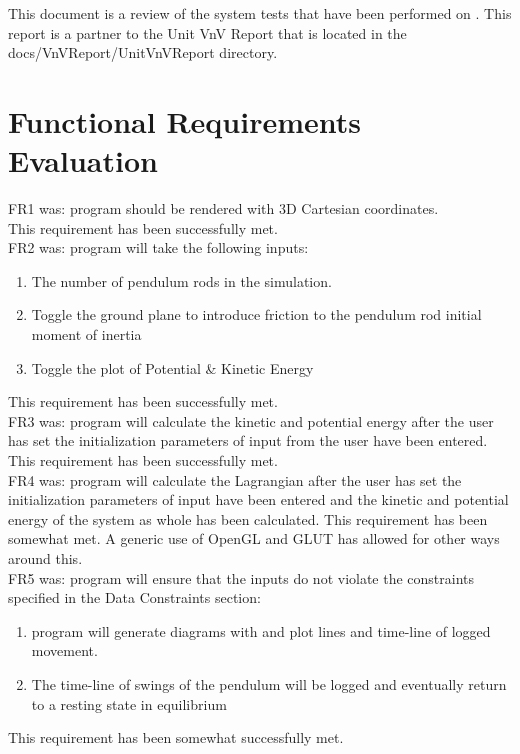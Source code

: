 \documentclass[12pt, titlepage]{article}
\begin{document}
\newpage

\tableofcontents

\listoftables %

\listoffigures %

\newpage


This document is a review of the system tests that have been performed on 
\progname{}. This report is a partner to the Unit VnV Report that is located in 
the docs/VnVReport/UnitVnVReport directory.

\section{Functional Requirements Evaluation}

FR1 was: \progname program should be rendered with 3D Cartesian coordinates. \\
This requirement has been successfully met.\\

\noindent FR2 was: \progname program 
  will take the following inputs: 
  \begin{enumerate}
   \item The number of pendulum rods in the simulation. 
   \item Toggle the ground plane to introduce friction to the
   pendulum rod initial moment of inertia
   \item Toggle the plot of Potential \& Kinetic Energy
  \end{enumerate}
 This requirement has been successfully met.\\
                    
FR3 was: \progname program 
will calculate the kinetic and potential energy after the user has set the 
initialization parameters of input from the user have been entered.\\
This requirement has been successfully met.\\

FR4 was: \progname program 
will calculate the Lagrangian after the user has set the initialization 
parameters of input have been entered and the kinetic and potential energy of 
the system as whole has been calculated.
This requirement has been somewhat met. A generic use of OpenGL and GLUT
has allowed for other ways around this.\\

FR5 was: \progname program
will ensure that the inputs do not violate the constraints specified in the 
Data Constraints section:
    \begin{enumerate} \item \progname program will 
generate diagrams with and plot lines and time-line of logged movement. 
\item The time-line of swings of the pendulum will be logged and eventually
return to a resting state in equilibrium
\end{enumerate} 
This requirement has been somewhat successfully met.\\
\end{document}
